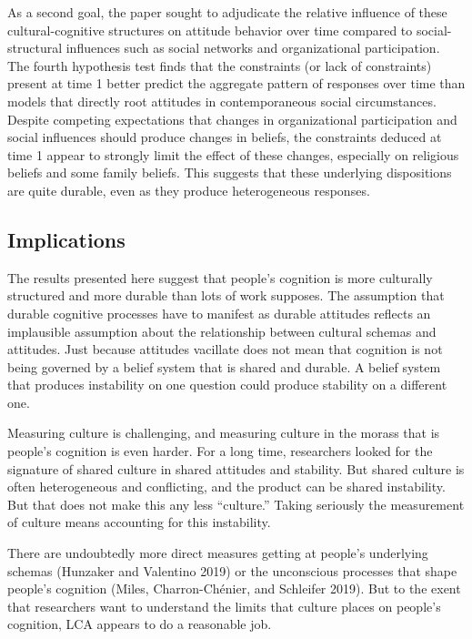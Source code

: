 \documentclass[12pt,]{article}
\begin{document}
As a second goal, the paper sought to adjudicate the relative influence of these cultural-cognitive structures on attitude behavior over time compared to social-structural influences such as social networks and organizational participation. The fourth hypothesis test finds that the constraints (or lack of constraints) present at time 1 better predict the aggregate pattern of responses over time than models that directly root attitudes in contemporaneous social circumstances. Despite competing expectations that changes in organizational participation and social influences should produce changes in beliefs, the constraints deduced at time 1 appear to strongly limit the effect of these changes, especially on religious beliefs and some family beliefs. This suggests that these underlying dispositions are quite durable, even as they produce heterogeneous responses.

\hypertarget{implications}{%
\subsection{Implications}\label{implications}}

The results presented here suggest that people's cognition is more culturally structured and more durable than lots of work supposes. The assumption that durable cognitive processes have to manifest as durable attitudes reflects an implausible assumption about the relationship between cultural schemas and attitudes. Just because attitudes vacillate does not mean that cognition is not being governed by a belief system that is shared and durable. A belief system that produces instability on one question could produce stability on a different one.

Measuring culture is challenging, and measuring culture in the morass that is people's cognition is even harder. For a long time, researchers looked for the signature of shared culture in shared attitudes and stability. But shared culture is often heterogeneous and conflicting, and the product can be shared instability. But that does not make this any less ``culture.'' Taking seriously the measurement of culture means accounting for this instability.

There are undoubtedly more direct measures getting at people's underlying schemas (Hunzaker and Valentino 2019) or the unconscious processes that shape people's cognition (Miles, Charron-Chénier, and Schleifer 2019). But to the exent that researchers want to understand the limits that culture places on people's cognition, LCA appears to do a reasonable job.
\end{document}
